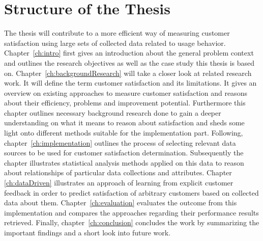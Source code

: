 \section{Structure of the Thesis}
The thesis will contribute to a more efficient way of measuring customer satisfaction using large sets of collected data related to usage behavior. Chapter~\ref{ch:intro} first gives an introduction about the general problem context and outlines the research objectives as well as the case study this thesis is based on. Chapter~\ref{ch:backgroundResearch} will take a closer look at related research work. It will define the term customer satisfaction and its limitations. It gives an overview on existing approaches to measure customer satisfaction and reasons about their efficiency, problems and improvement potential. Furthermore this chapter outlines necessary background research done to gain a deeper understanding on what it means to reason about satisfaction and sheds some light onto different methods suitable for the implementation part. Following, chapter~\ref{ch:implementation} outlines the process of selecting relevant data sources to be used for customer satisfaction determination. Subsequently the chapter illustrates statistical analysis methods applied on this data to reason about relationships of particular data collections and attributes. Chapter \ref{ch:dataDriven} illustrates an approach of learning from explicit customer feedback in order to predict satisfaction of arbitrary customers based on collected data about them. Chapter~\ref{ch:evaluation} evaluates the outcome from this implementation and compares the approaches regarding their performance results retrieved. Finally, chapter~\ref{ch:conclusion} concludes the work by summarizing the important findings and  a short look into future work.